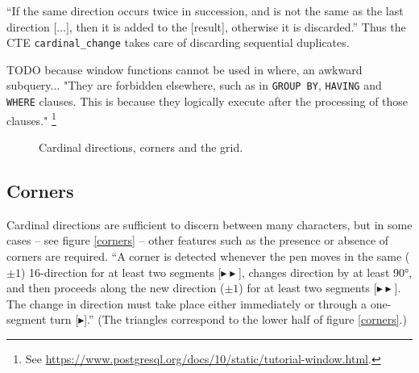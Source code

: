 \documentclass[sigconf]{acmart}
\begin{document}
\enquote{If the same direction occurs twice in succession, and is not the same as the last direction [...], then it is added to the [result], otherwise it is discarded.} \cite{groner} Thus the CTE \texttt{cardinal\_change} takes care of discarding sequential duplicates.

TODO because window functions cannot be used in where, an awkward subquery... "They are forbidden elsewhere, such as in \texttt{GROUP BY}, \texttt{HAVING} and \texttt{WHERE} clauses. This is because they logically execute after the processing of those clauses." \footnote{See \url{https://www.postgresql.org/docs/10/static/tutorial-window.html}.}

\begin{figure}[pb]
  \centering
  \hspace{0.5cm}
  \caption{Cardinal directions, corners and the grid.}
  \label{cornergrid}
\end{figure}

\subsection{Corners}

Cardinal directions are sufficient to discern between many characters, but in some cases – see figure \ref{corners} – other features such as the presence or absence of corners are required. \enquote{A corner is detected whenever the pen moves in the same ($\pm 1$) 16-direction for at least two segments [{\color[HTML]{21C800}$\blacktriangleright\blacktriangleright$}], changes direction by at least 90°, and then proceeds along the new direction ($\pm 1$) for at least two segments [{\color[HTML]{008AFF}$\blacktriangleright\blacktriangleright$}]. The change in direction must take place either immediately or through a one-segment turn [{\color[HTML]{FFC000}$\blacktriangleright$}].} \cite{groner} (The triangles correspond to the lower half of figure \ref{corners}.)
\end{document}
